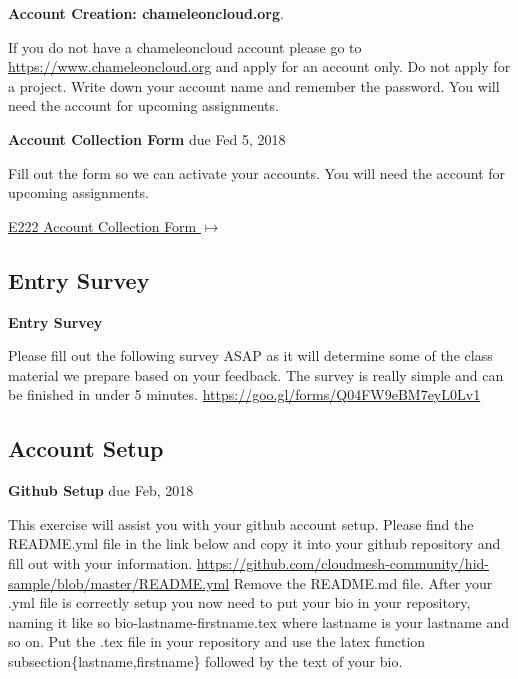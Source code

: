 \begin{exercise}
  {\bf Account Creation: chameleoncloud.org}. 
  
  If you do not have a chameleoncloud account please go to 
  \url{https://www.chameleoncloud.org} and apply for an
  account only. Do not apply for a project. Write down your account
  name and remember the password. You will need the account for
  upcoming assignments.
\end{exercise}

\begin{exercise}
   {\bf Account Collection Form } due Fed 5, 2018
 
 Fill out the form so we can activate your accounts. You will need the account for upcoming assignments.
 
  {\hfill \href{https://goo.gl/forms/W0MdgoJoY8F6Vt9Q2}{E222 Account Collection Form $\mapsto$}}
 
\end{exercise}

\subsection{Entry Survey}
\begin{exercise}
    {\bf Entry Survey}
    
 Please fill out the following survey ASAP as it will determine some of the class material we prepare based on your feedback. The survey is really simple and can be finished in under 5 minutes. \url{https://goo.gl/forms/Q04FW9eBM7eyL0Lv1}
\end{exercise}

\subsection{Account Setup}

\begin{exercise} {\bf Github Setup} due Feb, 2018

This exercise will assist you with your github account setup. Please
find the README.yml file in the link below and copy it into your
github repository and fill out with your
information. \url{https://github.com/cloudmesh-community/hid-sample/blob/master/README.yml}
Remove the README.md file. After your .yml file is correctly setup you
now need to put your bio in your repository, naming it like so
bio-lastname-firstname.tex where lastname is your lastname and so
on. Put the .tex file in your repository and use the latex function
subsection\{lastname,firstname\} followed by the text of your bio.


\end{exercise}

